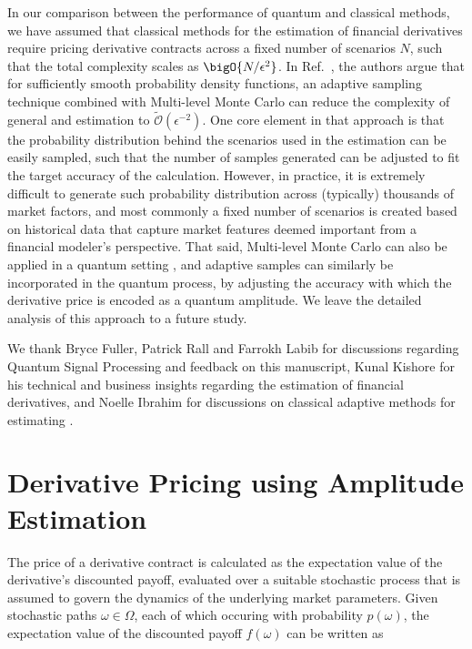 \begin{enumerate}
In our comparison between the performance of quantum and classical methods, we have assumed that classical methods for the \var{} estimation of financial derivatives require pricing derivative contracts across a fixed number of scenarios $N$, such that the total complexity scales as $\bigO{N/\epsilon^{2}}$.
In Ref.~\cite{giles2019}, the authors argue that for sufficiently smooth probability density functions, an adaptive sampling technique combined with Multi-level Monte Carlo can reduce the complexity of general \var{} and \cvar{} estimation to $\tilde{\mathcal{O}}(\epsilon^{-2})$.
One core element in that approach is that the probability distribution behind the scenarios used in the \var{} estimation can be easily sampled, such that the number of samples generated can be adjusted to fit the target accuracy of the calculation.
However, in practice, it is extremely difficult to generate such probability distribution across (typically) thousands of market factors, and most commonly a fixed number of scenarios is created based on historical data that capture market features deemed important from a financial modeler's perspective.
That said, Multi-level Monte Carlo can also be applied in a quantum setting \cite{An_2021}, and adaptive samples can similarly be incorporated in the quantum process, by adjusting the accuracy with which the derivative price is encoded as a quantum amplitude.
We leave the detailed analysis of this approach to a future study.


\begin{acknowledgments}
We thank Bryce Fuller, Patrick Rall and Farrokh Labib for discussions regarding Quantum Signal Processing and feedback on this manuscript, Kunal Kishore for his technical and business insights regarding the \var{} estimation of financial derivatives, and Noelle Ibrahim for discussions on classical adaptive methods for estimating \var{}.
\end{acknowledgments}





\appendix

\section{Derivative Pricing using Amplitude Estimation}
\label{app:ae}
The price of a derivative contract is calculated as the expectation value of the derivative's discounted payoff, evaluated over a suitable stochastic process that is assumed to govern the dynamics of the underlying market parameters.
Given stochastic paths $\omega \in \Omega$, each of which occuring with probability $p(\omega)$, the expectation value of the discounted payoff $f(\omega)$ can be written as


\end{enumerate}
